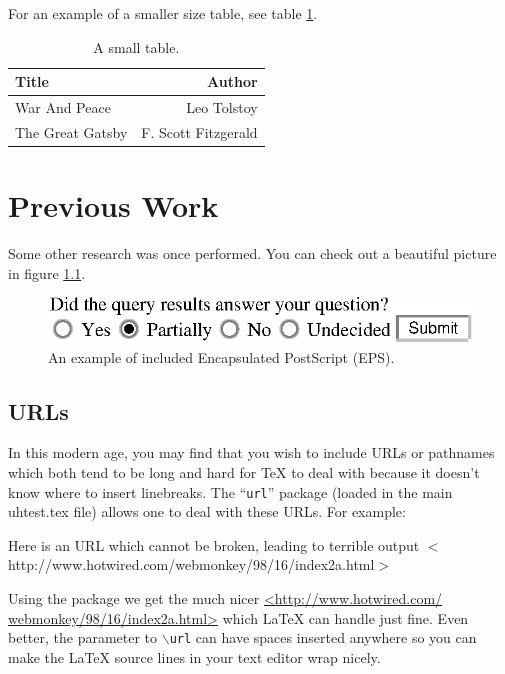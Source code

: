For an example of a smaller size table, see table \ref{tab:example-2}.

\begin{table}[htbp]
  \caption{A small table.}
  \label{tab:example-2}
  \begin{center}
    \begin{tabular}{|l|r|}
      \hline 
      Title & Author \\
      \hline
      War And Peace & Leo Tolstoy \\
      The Great Gatsby & F. Scott Fitzgerald \\ \hline
    \end{tabular}
  \end{center}
\end{table}

\chapter{Previous Work}

Some other research was once performed. You can check out a beautiful picture
in figure \ref{fig:example-1}.

\begin{figure}[htbp]
  \centering
  \includegraphics{uhtest-figure.eps}
  \caption{An example of included Encapsulated PostScript (EPS).}
  \label{fig:example-1}
\end{figure}

\section{URLs}
In this modern age, you may find that you wish to include URLs or pathnames
which both tend to be long and hard for TeX to deal with because it doesn't
know where to insert linebreaks. The ``{\tt url}'' package (loaded in the main
uhtest.tex file) allows one to deal with these URLs. For example:

Here is an URL which cannot be broken, leading to terrible output
$<$http://www.hotwired.com/webmonkey/98/16/index2a.html$>$

Using the package we get the much nicer \url{<http://www.hotwired.com/
webmonkey/98/16/index2a.html>} which LaTeX can handle just fine. Even better,
the parameter to {\tt $\backslash$url} can have spaces inserted anywhere so you
can make the LaTeX source lines in your text editor wrap nicely.

